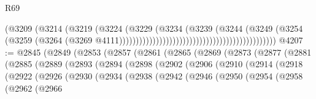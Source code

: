 \begin{lexlean}{R69}
\begin{coremodule}
{                                                                        (@3209
                                                                          (@3214
                                                                            (@3219
                                                                              (@3224
                                                                                (@3229
                                                                                  (@3234
                                                                                    (@3239
                                                                                      (@3244
                                                                                        (@3249
                                                                                          (@3254
                                                                                            (@3259
                                                                                              (@3264
                                                                                                (@3269
                                                                                                  @4111)))))))))))))))))))))))))))))))))))))))))))))))
@4207 := @2845
    (@2849
      (@2853
        (@2857
          (@2861
            (@2865
              (@2869
                (@2873
                  (@2877
                    (@2881
                      (@2885
                        (@2889
                          (@2893
                            (@2894
                              (@2898
                                (@2902
                                  (@2906
                                    (@2910
                                      (@2914
                                        (@2918
                                          (@2922
                                            (@2926
                                              (@2930
                                                (@2934
                                                  (@2938
                                                    (@2942
                                                      (@2946
                                                        (@2950
                                                          (@2954
                                                            (@2958
                                                              (@2962
                                                                (@2966
}
\end{coremodule}
\end{lexlean}
